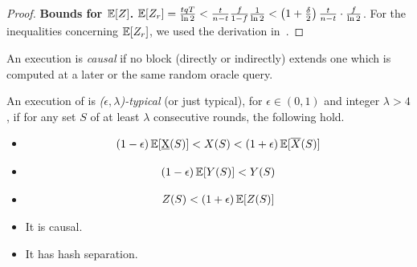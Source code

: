 \begin{proof}
  \noindent
  \textbf{Bounds for $\mathop{{}\mathbb{E}}[Z]$.}
  $\mathop{{}\mathbb{E}}[Z_r] = \frac{tqT}{\ln2} < \frac{t}{n - t}\frac{f}{1 - f}\frac{1}{\ln2} < \left(1 + \frac{\delta}{2}\right)\frac{t}{n - t} \cdot \frac{f}{\ln2}$. %
  For the inequalities concerning $\mathop{{}\mathbb{E}}[Z_r]$, we used the derivation in~\cite{backbone}.
\end{proof}

\begin{definition}[Causality]
  An execution is \emph{causal} if no block (directly or indirectly) extends
  one which is computed at a later or the same random oracle query.
\end{definition}

\begin{definition}
  An execution of \poem is \emph{($\epsilon,\lambda$)-typical} (or just typical),
  for $\epsilon \in (0,1)$ and integer $\lambda > 4$, if for any set $S$ of at
  least $\lambda$ consecutive rounds, the following hold.
  \begin{itemize}
    \item
    \begin{minipage}{\linewidth}%
      \vspace{-\abovedisplayskip}%
      \begin{align}%
        (1 - \epsilon) \E[\underbar{X}(S)] < X(S) < (1 + \epsilon) \E[\overline{X}(S)] \label{eq.typical-x}%
      \end{align}%
    \end{minipage}

    \item
    \begin{minipage}{\linewidth}%
      \vspace{-\abovedisplayskip}%
      \begin{align}%
        (1 - \epsilon) \E[Y(S)] < Y(S) \label{eq.typical-y}%
      \end{align}%
    \end{minipage}

    \item
    \begin{minipage}{\linewidth}%
      \vspace{-\abovedisplayskip}%
      \begin{align}%
        Z(S) < (1 + \epsilon)\E[Z(S)] \label{eq.typical-z}%
      \end{align}%
    \end{minipage}

    \item It is causal.
    \item It has hash separation.
  \end{itemize}
\end{definition}

